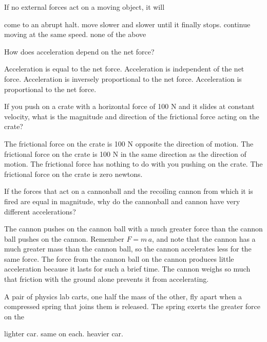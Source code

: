 \documentclass{exam}
\begin{document}
\begin{questions}
\newpage{}

\question If no external forces act on a moving object, it will
\begin{choices}
  \choice come to an abrupt halt.
  \choice move slower and slower until it finally stops.
  \choice continue moving at the same speed.
  \choice none of the above
\end{choices}
\vfill{}

\question How does acceleration depend on the net force?
\begin{choices}
  \choice Acceleration is equal to the net force.
  \choice Acceleration is independent of the net force.
  \choice Acceleration is inversely proportional to the net force.
  \choice Acceleration is proportional to the net force.
\end{choices}
\vfill{}

\question If you push on a crate with a horizontal force of 100 N and it slides at constant velocity, what is the magnitude and direction of the frictional force acting on the crate?
\begin{choices}
  \choice The frictional force on the crate is 100 N opposite the direction of motion.
  \choice The frictional force on the crate is 100 N in the same direction as the direction of motion.
  \choice The frictional force has nothing to do with you pushing on the crate.
  \choice The frictional force on the crate is zero newtons.
\end{choices}
\vfill{}

\question If the forces that act on a cannonball and the recoiling cannon from which it is fired are equal in magnitude, why do the cannonball and cannon have very different accelerations?
\begin{choices}
  \choice The cannon pushes on the cannon ball with a much greater force than the cannon ball pushes on the cannon.
  \choice Remember $F=m\,a$, and note that the cannon has a much greater mass than the cannon ball, so the cannon accelerates less for the same force.
  \choice The force from the cannon ball on the cannon produces little acceleration because it lasts for such a brief time.
  \choice The cannon weighs so much that friction with the ground alone prevents it from accelerating.
\end{choices}
\vfill{}

\question A pair of physics lab carts, one half the mass of the other, fly apart when a compressed spring that joins them is released. The spring exerts the greater force on the
\begin{choices}
  \choice lighter car.
  \choice same on each.
  \choice heavier car.
\end{choices}
\vfill{}


\end{questions}
\end{document}
